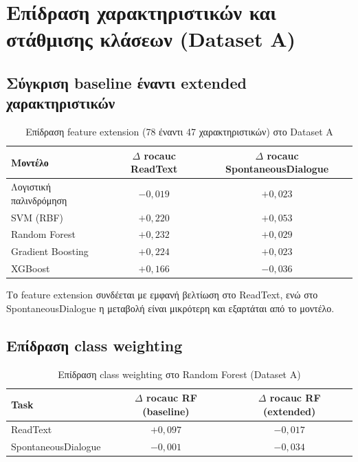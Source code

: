 \section{Επίδραση χαρακτηριστικών και στάθμισης κλάσεων (Dataset A)}

\subsection{Σύγκριση baseline έναντι extended χαρακτηριστικών}

\begin{table}[H]
\centering
\begin{tabular}{@{}lcc@{}}
\toprule
\textbf{Μοντέλο} & \textbf{$\Delta$ \gls{rocauc} ReadText} & \textbf{$\Delta$ \gls{rocauc} SpontaneousDialogue} \\
\midrule
Λογιστική παλινδρόμηση & $-0{,}019$ & $+0{,}023$ \\
SVM (RBF) & $+0{,}220$ & $+0{,}053$ \\
Random Forest & $+0{,}232$ & $+0{,}029$ \\
Gradient Boosting & $+0{,}224$ & $+0{,}023$ \\
XGBoost & $+0{,}166$ & $-0{,}036$ \\
\bottomrule
\end{tabular}
\caption{Επίδραση feature extension (78 έναντι 47 χαρακτηριστικών) στο Dataset A}
\label{tab:ablation-main}
\end{table}

Το feature extension συνδέεται με εμφανή βελτίωση στο ReadText, ενώ στο SpontaneousDialogue η μεταβολή είναι μικρότερη και εξαρτάται από το μοντέλο.

\subsection{Επίδραση class weighting}

\begin{table}[H]
\centering
\begin{tabular}{@{}lcc@{}}
\toprule
\textbf{Task} & \textbf{$\Delta$ \gls{rocauc} RF (baseline)} & \textbf{$\Delta$ \gls{rocauc} RF (extended)} \\
\midrule
ReadText & $+0{,}097$ & $-0{,}017$ \\
SpontaneousDialogue & $-0{,}001$ & $-0{,}034$ \\
\bottomrule
\end{tabular}
\caption{Επίδραση class weighting στο Random Forest (Dataset A)}
\label{tab:weighting-main}
\end{table}

